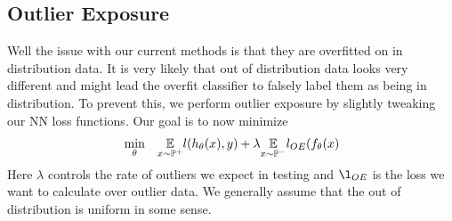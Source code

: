 \documentclass[11pt]{report}
\begin{document}
\subsection{Outlier Exposure}
Well the issue with our current methods is that they are overfitted on in distribution data. It is very likely that out of distribution data looks very different and might lead the overfit classifier to falsely label them as being in distribution. To prevent this, we perform outlier exposure by slightly tweaking our NN loss functions. Our goal is to now minimize
\begin{align}
    \begin{aligned}
            &\operatorname*{min}_{\theta}  && \underset{x \sim \mathbb{P}^+}{\mathbb{E}} l(h_\theta(x),y) + \lambda  \underset{x \sim \mathbb{P}^-}{\mathbb{E}} l_{OE}(f_\theta(x) \\
        \end{aligned} \nonumber
\end{align}
Here \(\lambda\) controls the rate of outliers we expect in testing and \(\l_{OE}\) is the loss we want to calculate over outlier data. We generally assume that the out of distribution is uniform in some sense.
\end{document}
